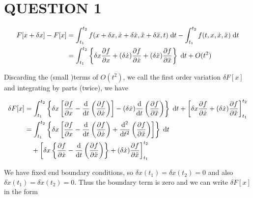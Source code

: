 \documentclass[a4paper]{article}
\begin{document}
	
\maketitle

\section{QUESTION 1}

\begin{align*}
F[x + \delta x] - F[x] & = \int_{t_{1}}^{t_{2}} f(x + \delta x, \dot{x} + \delta \dot{x}, \ddot{x} + \delta \ddot x, t ) \; \mathrm{d} t - \int_{t_{1}}^{t_2} f(t,x,\dot{x},\ddot{x}) \; \mathrm{d} t   \\
& = \int_{t_{1}}^{t_{2}} \left\{  \delta x \frac{\partial f }{\partial x} + (\delta \dot{x}) \frac{\partial f }{\partial \dot{x}} + (\delta \ddot{x}) \frac{\partial f }{\partial \ddot{x}}  \right\} \; \mathrm{d} t + O(t^{2})
\end{align*}

Discarding the (small )terms of $ O(t^{2}) $, we call the first order variation $ \delta F[x] $ and integrating by parts (twice), we have

\begin{align*}
\delta F[x]  & = \int_{t_{1}}^{t_{2}} \left\{   \delta x \left[   \frac{\partial f }{\partial x }  - \frac{\mathrm{d} }{\mathrm{d} t} \left(  \frac{\partial f }{\partial \dot{x}} \right)    \right]  - (\delta \dot{x}) \frac{\mathrm{d} }{\mathrm{d} t} \left(  \frac{\partial f }{\partial \ddot{x}} \right)   \right\} \; \mathrm{d} t + \left[  \delta x \frac{\partial f }{\partial \dot{x}} + ( \delta \dot{x}) \frac{\partial f }{\partial \ddot{x}} \right]_{t_{1}}^{t_{2}}   \\
& = \int_{t_{1}}^{t_{2}} \left\{   \delta x \left[   \frac{\partial f }{\partial x }  - \frac{\mathrm{d} }{\mathrm{d} t} \left(  \frac{\partial f }{\partial \dot{x}} \right)  +  \frac{\mathrm{d}^{2} }{\mathrm{d} t^{2}} \left(  \frac{\partial f }{\partial \ddot{x}} \right)   \right] \right\} \; \mathrm{d} t\\
& \quad + \left[  \delta x \left\{  \frac{\partial f }{\partial \dot{x}} - \frac{\mathrm{d} }{\mathrm{d} t} \left(  \frac{\partial f }{\partial \ddot{x}} \right)  \right\}  + ( \delta \dot{x}) \frac{\partial f }{\partial \ddot{x}}  \right]_{t_{1}}^{t_{2}}
\end{align*}

We have fixed end boundary conditions, so $ \delta x(t_{1}) = \delta x(t_{2}) = 0 $ and also $ \delta \dot{x} (t_{1}) = \delta \dot{x} (t_{2}) = 0  $. Thus the boundary term is zero and we can write $ \delta F[x] $ in the form
\end{document}

